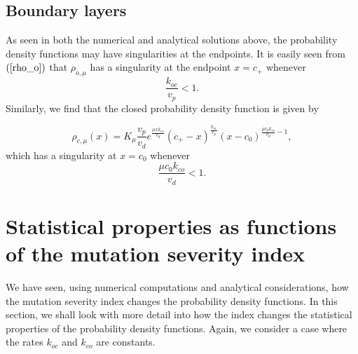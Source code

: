 
\subsection{Boundary layers}

As seen in both the numerical and analytical solutions above, the probability
density functions may have singularities at the endpoints. It is easily seen
from $\left(  \ref{rho_o}\right)  $ that $\rho_{o,\mu}$ has a singularity at
the endpoint $x=c_{+}$ whenever%
\[
\frac{k_{oc}}{v_{p}}<1.
\]
Similarly, we find that the closed probability density function is given by

%

\[
\rho_{c,\mu}(x)=K_{\mu}\frac{v_{p}}{v_{d}}e^{\frac{\mu xk_{co}}{v_{d}}}%
(c_{+}-x)^{\frac{k_{oc}}{v_{p}}}(x-c_{0})^{\frac{\mu c_{0}k_{co}}{v_{d}}-1},%
\]
which has a singularity at $x=c_{0}$ whenever%
\[
\frac{\mu c_{0}k_{co}}{v_{d}}<1.
\]


\bigskip

\section[Statistical properties of the mutation]{Statistical properties as functions of the mutation severity index}

We have seen, using numerical computations and analytical considerations, how
the mutation severity index changes the probability density functions. In this
section, we shall look with more detail into how the index changes the
statistical properties of the probability density functions. Again, we consider a case where
the rates $k_{oc}$ and  $k_{co}$ are constants.



